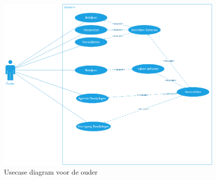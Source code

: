 \documentclass[a4paper]{article}
\begin{document}
\begin{figure}[H]
  \includegraphics[width=\textwidth]{uc_ouder}
  \caption{Usecase diagram voor de ouder}
  \label{fig:usecase_ouder}
\end{figure}
\end{document}
